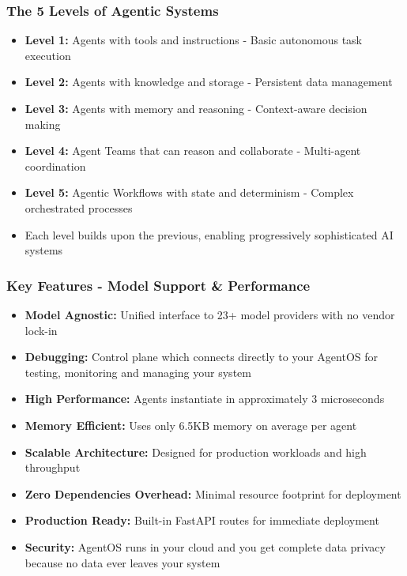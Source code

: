 \begin{frame}[fragile]\frametitle{The 5 Levels of Agentic Systems}
      \begin{itemize}
	\item \textbf{Level 1:} Agents with tools and instructions - Basic autonomous task execution
	\item \textbf{Level 2:} Agents with knowledge and storage - Persistent data management
	\item \textbf{Level 3:} Agents with memory and reasoning - Context-aware decision making
	\item \textbf{Level 4:} Agent Teams that can reason and collaborate - Multi-agent coordination
	\item \textbf{Level 5:} Agentic Workflows with state and determinism - Complex orchestrated processes
	\item Each level builds upon the previous, enabling progressively sophisticated AI systems
	  \end{itemize}
\end{frame}

\begin{frame}[fragile]\frametitle{Key Features - Model Support \& Performance}
      \begin{itemize}
	\item \textbf{Model Agnostic:} Unified interface to 23+ model providers with no vendor lock-in
	\item \textbf{Debugging:} Control plane which connects directly to your AgentOS for testing, monitoring and managing your system
	\item \textbf{High Performance:} Agents instantiate in approximately 3 microseconds
	\item \textbf{Memory Efficient:} Uses only 6.5KB memory on average per agent
	\item \textbf{Scalable Architecture:} Designed for production workloads and high throughput
	\item \textbf{Zero Dependencies Overhead:} Minimal resource footprint for deployment
	\item \textbf{Production Ready:} Built-in FastAPI routes for immediate deployment
	\item \textbf{Security:} AgentOS runs in your cloud and you get complete data privacy because no data ever leaves your system
	  \end{itemize}
\end{frame}

